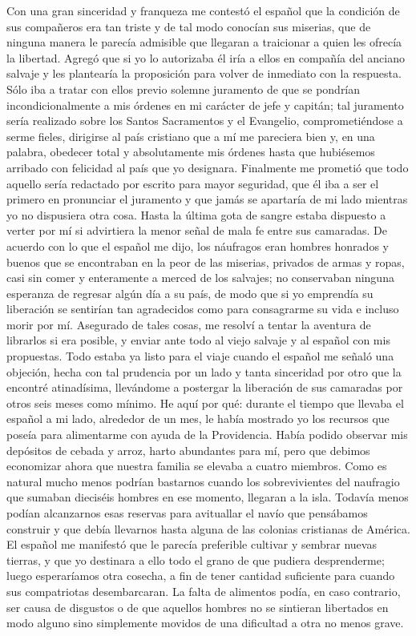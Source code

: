 \documentclass{novela}
\begin{document}
    Con una gran sinceridad y franqueza me contestó el español que la condición de sus compañeros era tan triste y de tal modo conocían sus miserias, que de ninguna manera le parecía admisible que llegaran a traicionar a quien les ofrecía la libertad. Agregó que si yo lo autorizaba él iría a ellos en compañía del anciano salvaje y les plantearía la proposición para volver de inmediato con la respuesta. Sólo iba a tratar con ellos previo solemne juramento de que se pondrían incondicionalmente a mis órdenes en mi carácter de jefe y capitán; tal juramento sería realizado sobre los Santos Sacramentos y el Evangelio, comprometiéndose a serme fieles, dirigirse al país cristiano que a mí me pareciera bien y, en una palabra, obedecer total y absolutamente mis órdenes hasta que hubiésemos arribado con felicidad al país que yo designara. Finalmente me prometió que todo aquello sería redactado por escrito para mayor seguridad, que él iba a ser el primero en pronunciar el juramento y que jamás se apartaría de mi lado mientras yo no dispusiera otra cosa. Hasta la última gota de sangre estaba dispuesto a verter por mí si advirtiera la menor señal de mala fe entre sus camaradas.
    De acuerdo con lo que el español me dijo, los náufragos eran hombres honrados y buenos que se encontraban en la peor de las miserias, privados de armas y ropas, casi sin comer y enteramente a merced de los salvajes; no conservaban ninguna esperanza de regresar algún día a su país, de modo que si yo emprendía su liberación se sentirían tan agradecidos como para consagrarme su vida e incluso morir por mí.
    Asegurado de tales cosas, me resolví a tentar la aventura de librarlos si era posible, y enviar ante todo al viejo salvaje y al español con mis propuestas. Todo estaba ya listo para el viaje cuando el español me señaló una objeción, hecha con tal prudencia por un lado y tanta sinceridad por otro que la encontré atinadísima, llevándome a postergar la liberación de sus camaradas por otros seis meses como mínimo.
    He aquí por qué: durante el tiempo que llevaba el español a mi lado, alrededor de un mes, le había mostrado yo los recursos que poseía para alimentarme con ayuda de la Providencia. Había podido observar mis depósitos de cebada y arroz, harto abundantes para mí, pero que debimos economizar ahora que nuestra familia se elevaba a cuatro miembros. Como es natural mucho menos podrían bastarnos cuando los sobrevivientes del naufragio que sumaban dieciséis hombres en ese momento, llegaran a la isla. Todavía menos podían alcanzarnos esas reservas para avituallar el navío que pensábamos construir y que debía llevarnos hasta alguna de las colonias cristianas de América. El español me manifestó que le parecía preferible cultivar y sembrar nuevas tierras, y que yo destinara a ello todo el grano de que pudiera desprenderme; luego esperaríamos otra cosecha, a fin de tener cantidad suficiente para cuando sus compatriotas desembarcaran. La falta de alimentos podía, en caso contrario, ser causa de disgustos o de que aquellos hombres no se sintieran libertados en modo alguno sino simplemente movidos de una dificultad a otra no menos grave.
\end{document}
